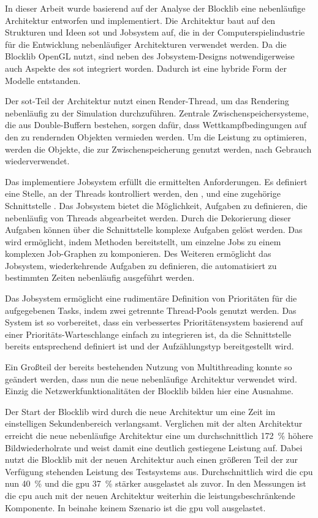 In dieser Arbeit wurde basierend auf der Analyse der Blocklib eine nebenläufige Architektur entworfen und implementiert. Die Architektur baut auf den Strukturen und Ideen \acf{sot} und Jobsystem auf, die in der Computerspielindustrie für die Entwicklung nebenläufiger Architekturen verwendet werden. Da die Blocklib OpenGL nutzt, sind neben des Jobsystem-Designs notwendigerweise auch Aspekte des \ac{sot} integriert worden. Dadurch ist eine hybride Form der Modelle entstanden.

Der \ac{sot}-Teil der Architektur nutzt einen Render-Thread, um das Rendering nebenläufig zu der Simulation durchzuführen. Zentrale Zwischenspeichersysteme, die aus Double-Buffern bestehen, sorgen dafür, dass Wettkampfbedingungen auf den zu rendernden Objekten vermieden werden. Um die Leistung zu optimieren, werden die Objekte, die zur Zwischenspeicherung genutzt werden, nach Gebrauch wiederverwendet.

Das implementiere Jobsystem erfüllt die ermittelten Anforderungen. Es definiert eine Stelle, an der Threads kontrolliert werden, den \classBlocklibExecutor{}, und eine zugehörige Schnittstelle \classBlocklibExecutorService{}. Das Jobsystem bietet die Möglichkeit, Aufgaben zu definieren, die nebenläufig von Threads abgearbeitet werden. Durch die Dekorierung dieser Aufgaben können über die Schnittstelle \classCompletionStage{} komplexe Aufgaben gelöst werden. Das wird ermöglicht, indem \classCompletionStage{} Methoden bereitstellt, um einzelne Jobs zu einem komplexen Job-Graphen zu komponieren. Des Weiteren ermöglicht das Jobsystem, wiederkehrende Aufgaben zu definieren, die automatisiert zu bestimmten Zeiten nebenläufig ausgeführt werden.

Das Jobsystem ermöglicht eine rudimentäre Definition von Prioritäten für die aufgegebenen Tasks, indem zwei getrennte Thread-Pools genutzt werden. Das System ist so vorbereitet, dass ein verbessertes Prioritätensystem basierend auf einer Prioritäts-Warteschlange einfach zu integrieren ist, da die Schnittstelle \classBlocklibExecutorService{} bereits entsprechend definiert ist und der Aufzählungstyp \classTaskPriority{} bereitgestellt wird.

Ein Großteil der bereits bestehenden Nutzung von Multithreading konnte so geändert werden, dass nun die neue nebenläufige Architektur verwendet wird. Einzig die Netzwerkfunktionalitäten der Blocklib bilden hier eine Ausnahme.

Der Start der Blocklib wird durch die neue Architektur um eine Zeit im einstelligen Sekundenbereich verlangsamt. Verglichen mit der alten Architektur erreicht die neue nebenläufige Architektur eine um durchschnittlich \SI{172}{\percent} höhere Bildwiederholrate und weist damit eine deutlich gestiegene Leistung auf. Dabei nutzt die Blocklib mit der neuen Architektur auch einen größeren Teil der zur Verfügung stehenden Leistung des Testsystems aus. Durchschnittlich wird die \ac{cpu} nun \SI{40}{\percent} und die \ac{gpu} \SI{37}{\percent} stärker ausgelastet als zuvor. In den Messungen ist die \ac{cpu} auch mit der neuen Architektur weiterhin die leistungsbeschränkende Komponente. In beinahe keinem Szenario ist die \ac{gpu} voll ausgelastet.
